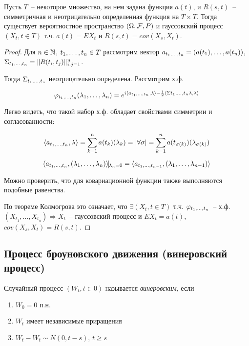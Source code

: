 \begin{theorem}
Пусть $T$~-- некоторое множество, на нем задана функция $a(t)$, и $R(s, t)$~-- симметричная и
неотрицательно определенная функция на $T \times T$. Тогда существует вероятностное пространство
$(\Omega, \mathcal{F}, P)$ и гауссовский процесс $(X_t, t \in T)$ т.ч. $a(t) = EX_t$ и
$R(s,t) =  cov(X_s, X_t)$.
\end{theorem}
\begin{proof}
Для $n \in \mathbb{N}$, $t_{1}, \dots, t_{n}  \in T$  рассмотрим вектор $a_{t_{1}, \dots, t_{n}} =
(a(t_1), \dots, a(t_n))$, $\Sigma_{t_{1}, \dots, t_{n}} = \Vert R(t_i, t_j) \Vert^n_{i,j=1}$.

Тогда $\Sigma_{t_{1}, \dots, t_{n}}$ неотрицательно определена. Рассмотрим х.ф.

$$\varphi_{t_{1}, \dots, t_{n}}(\lambda_{1}, \dots, \lambda_{n}) = e^{i \langle a_{t_{1}, \dots, t_{n}}, \lambda\rangle -
\frac12\langle\Sigma{t_{1}, \dots, t_{n}}\lambda, \lambda\rangle}$$

Легко видеть, что такой набор х.ф. обладает свойствами симметрии и согласованности:

$$\langle a_{t_{1}, \dots, t_{n}}, \lambda \rangle
= \sum_{k=1}^n a(t_k)(\lambda_k) = |\forall \sigma| =
\sum_{k=1}^n a(t_{\sigma(k)})(\lambda_{\sigma(k)})$$

$$\langle a_{\seq t 1 n}, (\seq \lambda 1 n)\rangle \vline_{\lambda_n = 0} =
\langle a_{\seq t 1 {n-1}}, (\seq \lambda 1 {n-1}) \rangle$$

Можно проверить, что для ковариационной функции также выполняются подобные равенства.

По теореме Колмогрова это означает, что $\exists (X_t, t \in T)$ т.ч.
$\varphi_{t_{1}, \dots, t_{n}}$~-- х.ф. $(X_{t_1}, \dots, X_{t_n}) \Rightarrow X_t$~-- гауссовский
процесс и $EX_t = a(t)$, $cov(X_s, X_t) = R(s,t)$.
\end{proof}

\subsection{Процесс броуновского движения (винеровский процесс)}

\begin{definition}
Случайный процесс $(W_t, t \in 0)$ называется \emph{винеровским}, если
\begin{enumerate}
\item $W_0 = 0$ п.н.
\item $W_t$ имеет независимые приращения
\item $W_t - W_t \sim N(0, t-s)$, $t \geq s$
\end{enumerate}
\end{definition}

